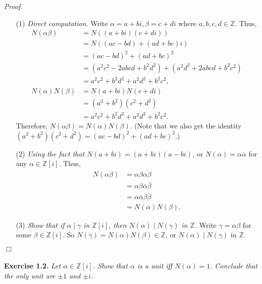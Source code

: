 \documentclass{article}
\begin{document}
\emph{Proof.}
\begin{enumerate}
\item[(1)]
\emph{Direct computation.}
Write $\alpha = a+bi, \beta=c+di$ where $a, b, c, d \in \mathbb{Z}$.
Thus,
\begin{align*}
N(\alpha\beta)
&= N((a+bi)(c+di)) \\
&= N((ac-bd) + (ad+bc)i) \\
&= (ac-bd)^2 + (ad+bc)^2 \\
&= (a^2 c^2 - 2abcd + b^2 d^2) + (a^2 d^2 + 2abcd + b^2 c^2) \\
&= a^2 c^2 + b^2 d^2 + a^2 d^2 + b^2 c^2, \\
N(\alpha)N(\beta)
&= N(a+bi) N(c+di) \\
&= (a^2 + b^2)(c^2 + d^2) \\
&= a^2 c^2 + b^2 d^2 + a^2 d^2 + b^2 c^2.
\end{align*}
Therefore, $N(\alpha\beta) = N(\alpha)N(\beta)$.
(Note that we also get the identity
$(a^2 + b^2)(c^2 + d^2) = (ac-bd)^2 + (ad+bc)^2$.)
\item[(2)]
\emph{Using the fact that $N(a+bi) = (a+bi)(a-bi)$,}
or $N(\alpha) = \alpha \overline{\alpha}$
for any $\alpha \in \mathbb{Z}[i]$.
Thus,
\begin{align*}
N(\alpha\beta)
&= \alpha\beta\overline{\alpha\beta} \\
&= \alpha\beta\overline{\alpha}\overline{\beta} \\
&= \alpha\overline{\alpha}\beta\overline{\beta} \\
&= N(\alpha)N(\beta).
\end{align*}
\item[(3)]
\emph{Show that if $\alpha \mid \gamma$ in $\mathbb{Z}[i]$,
then $N(\alpha) \mid N(\gamma)$ in $\mathbb{Z}$.}
Write $\gamma = \alpha \beta$ for some $\beta \in \mathbb{Z}[i]$.
So $N(\gamma) = N(\alpha) N(\beta) \in \mathbb{Z}$,
or $N(\alpha) \mid N(\gamma)$ in $\mathbb{Z}$.
\end{enumerate}
$\Box$ \\\\






\textbf{Exercise 1.2.}
\emph{Let $\alpha \in \mathbb{Z}[i]$.
Show that $\alpha$ is a unit iff $N(\alpha) = 1$.
Conclude that the only unit are $\pm 1$ and $\pm i$.} \\
\end{document}
